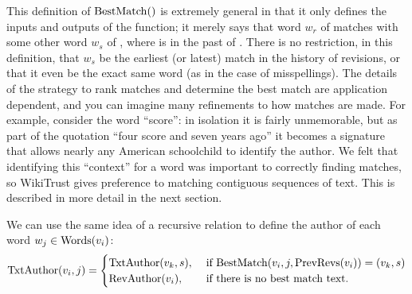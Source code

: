 This definition of $\mathrm{BestMatch}()$ is extremely general in that it only
defines the inputs and outputs of the function; it merely
says that word $w_r$ of  matches with some other word $w_s$
of , where  is in the past of .
There is no restriction, in this definition, that $w_s$ be the earliest
(or latest) match in the history of revisions, or that it even be
the exact same word (as in the case of misspellings).
The details of the strategy to rank matches and determine the best match
are application dependent, and you can imagine many refinements to how
matches are made.
For example, consider the word ``score'': in isolation it is fairly
unmemorable, but as part of the quotation ``four score and seven years
ago'' it becomes a signature that allows nearly any American
schoolchild to identify the author.
We felt that identifying this ``context'' for a word was important to
correctly finding matches, so WikiTrust gives preference to matching
contiguous sequences of text.
This is described in more detail in the next section.

We can use the same idea of a recursive relation to define
the author of each word $w_j \in \mathrm{Words}(v_{i})$:
\begin{equation}
\txtauthor{\version{i}, j} =
    \begin{cases}
	\txtauthor{\version{k}, s}, & \text{ if }
	\match{\version{i}, j, \prevrevs{\version{i}}} = (\version{k}, s) \\
	\revauthor{\version{i}}, & \text{ if there is no best match text. } \\
    \end{cases}
\label{def:txtauthor}
\end{equation}

